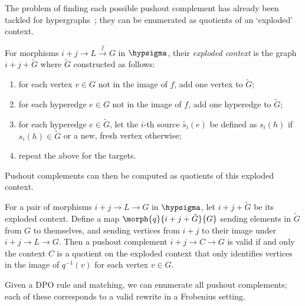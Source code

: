 The problem of finding each possible pushout complement has already been
tackled for hypergraphs~\cite{heumuller2011construction}; they can be enumerated
as quotients of an `exploded' context.

\begin{definition}
    For morphisms \(i+j \to L \xrightarrow{f} G\) in \(\hypsigma\),
    their \emph{exploded context} is the graph
    \(i + j + \tilde{G}\) where \(\tilde{G}\) constructed as follows:
    \begin{enumerate}
        \item for each vertex \(v \in G\) not in the image of \(f\), add one
              vertex to \(\tilde{G}\);
        \item for each hyperedge \(e \in G\) not in the image of \(f\), add one
              hyperedge to \(\tilde{G}\);
        \item for each hyperedge \(e \in \tilde{G}\), let the \(i\)-th source
              \(\tilde{s_i}(e)\) be defined as \(s_i(h)\) if
              \(s_i(h) \in \tilde{G}\) or a new, fresh vertex otherwise;
        \item repeat the above for the targets.
    \end{enumerate}
\end{definition}

Pushout complements can then be computed as quotients of this exploded
context.

\begin{proposition}
    For a pair of morphisms \(i+j \to L \to G\) in \(\hypsigma\), let
    \(i + j + \tilde{G}\) be its exploded context.
    Define a map \(\morph{q}{i + j + \tilde{G}}{G}\) sending elements in
    \(\tilde{G}\) from \(G\) to themselves, and sending vertices from
    \(i + j\) to their image under \(i + j \to L \to G\).
    Then a pushout complement \(i + j \to C \to G\) is valid if and only the
    context \(C\) is a quotient on the exploded context that only identifies
    vertices in the image of \(q^{-1}(v)\) for each vertex \(v \in G\).
\end{proposition}

Given a DPO rule and matching, we can enumerate all pushout complements; each of
these corresponds to a valid rewrite in a Frobenius setting.

